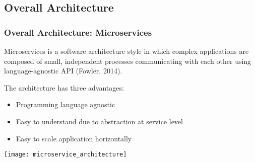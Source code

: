 \subsection{Overall Architecture}
\label{subsection:overall_architecture}
\begin{frame}[allowframebreaks]
\frametitle{Overall Architecture: Microservices}

\begin{definition}
Microservices is a software architecture style in which complex applications are composed of small, independent processes communicating with each other using language-agnostic API (Fowler, 2014).
\end{definition}

The architecture has three advantages:
\begin{itemize}
  \item Programming language agnostic
  \item Easy to understand due to abstraction at service level
  \item Easy to scale application horizontally
\end{itemize}

\hyperlink{appendix:monolithic}{}

\framebreak

\begin{center}
\texttt{[image: microservice\_architecture]}
\end{center}
\end{frame}